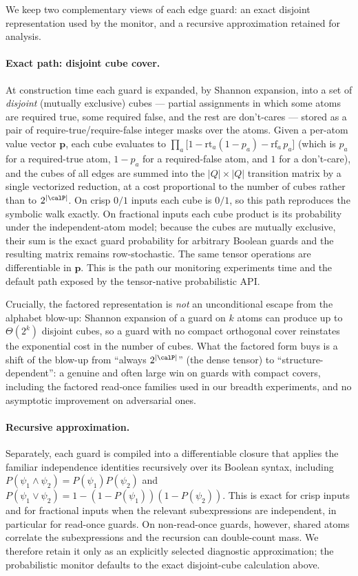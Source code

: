We keep two complementary views of each edge guard: an exact disjoint representation used by the monitor, and a recursive approximation retained for analysis.

\paragraph{Exact path: disjoint cube cover.} At construction time each guard is expanded, by Shannon expansion, into a set of \emph{disjoint} (mutually exclusive) cubes --- partial assignments in which some atoms are required true, some required false, and the rest are don't-cares --- stored as a pair of require-true/require-false integer masks over the atoms. Given a per-atom value vector $\mathbf{p}$, each cube evaluates to $\prod_a \big[1 - \mathrm{rt}_a (1 - p_a) - \mathrm{rf}_a\, p_a\big]$ (which is $p_a$ for a required-true atom, $1 - p_a$ for a required-false atom, and $1$ for a don't-care), and the cubes of all edges are summed into the $|Q| \times |Q|$ transition matrix by a single vectorized reduction, at a cost proportional to the number of cubes rather than to $2^{|\calP|}$. On crisp $0/1$ inputs each cube is $0/1$, so this path reproduces the symbolic walk exactly. On fractional inputs each cube product is its probability under the independent-atom model; because the cubes are mutually exclusive, their sum is the exact guard probability for arbitrary Boolean guards and the resulting matrix remains row-stochastic. The same tensor operations are differentiable in $\mathbf p$. This is the path our monitoring experiments time and the default path exposed by the tensor-native probabilistic API.

Crucially, the factored representation is \emph{not} an unconditional escape from the alphabet blow-up: Shannon expansion of a guard on $k$ atoms can produce up to $\Theta(2^k)$ disjoint cubes, so a guard with no compact orthogonal cover reinstates the exponential cost in the number of cubes. What the factored form buys is a shift of the blow-up from ``always $2^{|\calP|}$'' (the dense tensor) to ``structure-dependent'': a genuine and often large win on guards with compact covers, including the factored read-once families used in our breadth experiments, and no asymptotic improvement on adversarial ones.

\paragraph{Recursive approximation.} Separately, each guard is compiled into a differentiable closure that applies the familiar independence identities recursively over its Boolean syntax, including $P(\psi_1\land\psi_2)=P(\psi_1)P(\psi_2)$ and $P(\psi_1\lor\psi_2)=1-(1-P(\psi_1))(1-P(\psi_2))$. This is exact for crisp inputs and for fractional inputs when the relevant subexpressions are independent, in particular for read-once guards. On non-read-once guards, however, shared atoms correlate the subexpressions and the recursion can double-count mass. We therefore retain it only as an explicitly selected diagnostic approximation; the probabilistic monitor defaults to the exact disjoint-cube calculation above.

